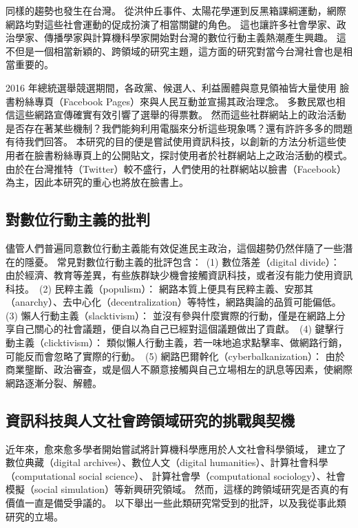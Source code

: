 \documentclass[a4paper, 10pt, conference]{ieeeconf}       %
\begin{document}
\begin{CJK}{UTF8}{bsmi}
同樣的趨勢也發生在台灣。%
從洪仲丘事件、太陽花學運到反黑箱課綱運動，網際網路均對這些社會運動的促成扮演了相當關鍵的角色。%
這也讓許多社會學家、政治學家、傳播學家與計算機科學家開始對台灣的數位行動主義熱潮產生興趣。%
這不但是一個相當新穎的、跨領域的研究主題，這方面的研究對當今台灣社會也是相當重要的。%

2016 年總統選舉競選期間，各政黨、候選人、利益團體與意見領袖皆大量使用%
臉書粉絲專頁（Facebook Pages）來與人民互動並宣揚其政治理念。%
多數民眾也相信這些網路宣傳確實有效引響了選舉的得票數。%
然而這些社群網站上的政治活動是否存在著某些機制？我們能夠利用電腦來分析這些現象嗎？還有許許多多的問題有待我們回答。%
本研究的目的便是嘗試使用資訊科技，以創新的方法分析這些使用者在臉書粉絲專頁上的公開貼文，探討使用者於社群網站上之政治活動的模式。%
由於在台灣推特（Twitter）較不盛行，人們使用的社群網站以臉書（Facebook）為主，因此本研究的重心也將放在臉書上。%

\subsection*{對數位行動主義的批判}

儘管人們普遍同意數位行動主義能有效促進民主政治，這個趨勢仍然伴隨了一些潛在的隱憂。%
常見對數位行動主義的批評包含：%
\,(1) 數位落差（digital divide）：%
由於經濟、教育等差異，有些族群缺少機會接觸資訊科技，或者沒有能力使用資訊科技。%
\,(2) 民粹主義（populism）：%
網路本質上便具有民粹主義、安那其（anarchy）、去中心化（decentralization）等特性，網路輿論的品質可能偏低。%
\,(3) 懶人行動主義（slacktivism）：%
並沒有參與什麼實際的行動，僅是在網路上分享自己關心的社會議題，便自以為自己已經對這個議題做出了貢獻。%
\,(4) 鍵擊行動主義（clicktivism）：%
類似懶人行動主義，若一味地追求點擊率、做網路行銷，可能反而會忽略了實際的行動。%
\,(5) 網路巴爾幹化（cyberbalkanization）：%
由於商業壟斷、政治審查，或是個人不願意接觸與自己立場相左的訊息等因素，使網際網路逐漸分裂、解體。%

\subsection*{資訊科技與人文社會跨領域研究的挑戰與契機}

近年來，愈來愈多學者開始嘗試將計算機科學應用於人文社會科學領域，%
建立了數位典藏（digital archives）、數位人文（digital humanities）、計算社會科學（computational social science）、%
計算社會學（computational sociology）、社會模擬（social simulation）等新興研究領域。%
然而，這樣的跨領域研究是否真的有價值一直是備受爭議的。%
以下舉出一些此類研究常受到的批評，以及我從事此類研究的立場。%


\end{CJK}
\end{document}
